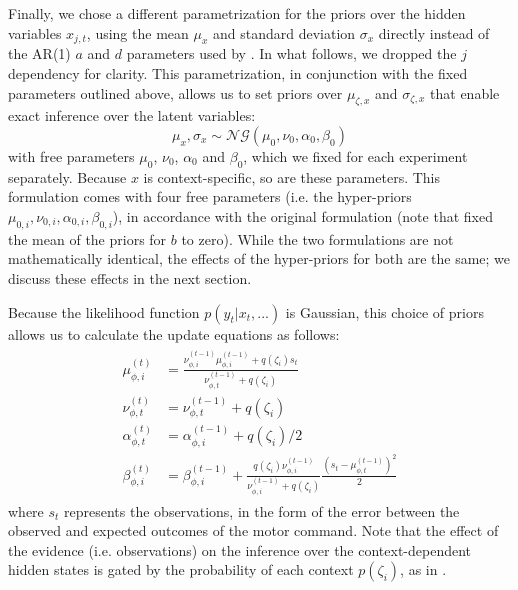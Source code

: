 \documentclass[a4paper,doc,floatsintext,natbib]{apa6}
\begin{document}
Finally, we chose a different parametrization for the priors over the hidden variables $x_{j,t}$, using the mean $\mu_x$ and standard deviation $\sigma_x$ directly instead of the AR(1) $a$ and $d$ parameters used by \cite{Heald_Contextual_2021}. In what follows, we dropped the $j$ dependency for clarity. This parametrization, in conjunction with the fixed parameters outlined above, allows us to set priors over $\mu_{\zeta,x}$ and $\sigma_{\zeta,x}$ that enable exact inference over the latent variables:
\begin{equation}
\mu_x, \sigma_x \sim \mathcal{NG}(\mu_0, \nu_0, \alpha_0, \beta_0)
\end{equation}
with free parameters $\mu_0$, $\nu_0$, $\alpha_0$ and $\beta_0$, which we fixed for each experiment separately. Because $x$ is context-specific, so are these parameters. This formulation comes with four free parameters (i.e. the hyper-priors $\mu_{0,i}, \nu_{0,i}, \alpha_{0,i}, \beta_{0,i}$), in accordance with the original formulation (note that \cite{Heald_Contextual_2021} fixed the mean of the priors for $b$ to zero). While the two formulations are not mathematically identical, the effects of the hyper-priors for both are the same; we discuss these effects in the next section.

Because the likelihood function $p(y_t | x_t, ...)$ is Gaussian, this choice of priors allows us to calculate the update equations as follows:
\begin{align}
  \begin{split}
  \mu_{\phi, i}^{(t)} &= \frac{\nu_{\phi,i}^{(t-1)} \mu_{\phi,i}^{(t-1)} + q(\zeta_i)s_t}{\nu_{\phi,t}^{(t-1)} + q(\zeta_i)} \\
  \nu_{\phi,t}^{(t)} &= \nu_{\phi,t}^{(t-1)} + q(\zeta_i) \\
  \alpha_{\phi,t}^{(t)} &= \alpha_{\phi,i}^{(t-1)} + q(\zeta_i) / 2 \\
  \beta_{\phi,i}^{(t)} &= \beta_{\phi,i}^{(t-1)} + \frac{q(\zeta_i)\nu_{\phi,i}^{(t-1)}}{\nu_{\phi,i}^{(t-1)} +
    q(\zeta_i)}\frac{\left(s_t - \mu_{\phi,t}^{(t-1)}\right)^2}{2}  \label{eqn:update-full}
  \end{split}
\end{align}
where $s_t$ represents the observations, in the form of the error between the observed and expected outcomes of the motor command. Note that the effect of the evidence (i.e. observations) on the inference over the context-dependent hidden states is gated by the probability of each context $p(\zeta_i)$, as in \cite[][supplementary materials]{Heald_Contextual_2021}.
\end{document}
